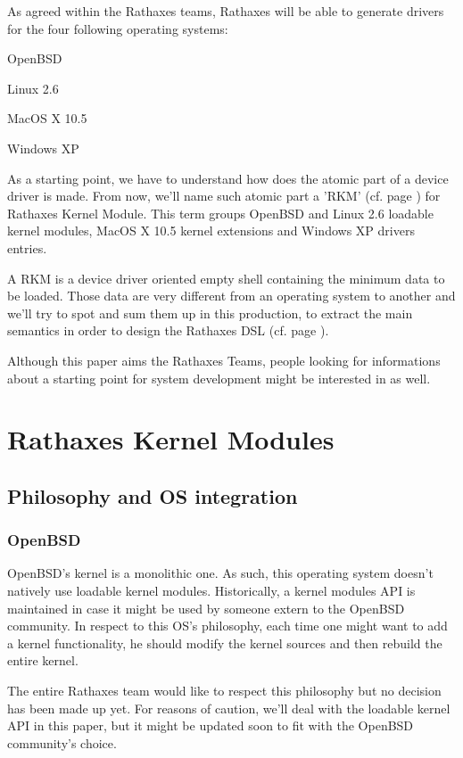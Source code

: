 \documentclass[11pt]{report}
\begin{document}
As agreed within the Rathaxes teams, Rathaxes will be able to generate drivers
for the four following operating systems:
\begin{description}
    \item{OpenBSD}
    \item{Linux 2.6}
    \item{MacOS X 10.5}
    \item{Windows XP}
\end{description}

As a starting point, we have to understand how does the atomic part of a device 
driver is made. From now, we'll name such atomic part a 'RKM' (cf. page \pageref{RKM}) 
for Rathaxes Kernel Module. This term groups OpenBSD and Linux 2.6 loadable kernel modules,
MacOS X 10.5 kernel extensions and Windows XP drivers entries.

A RKM is a device driver oriented empty shell containing the minimum data
to be loaded. Those data are very different from an operating system to
another and we'll try to spot and sum them up in this production, to extract the
main semantics in order to design the Rathaxes DSL (cf. page \pageref{DSL}).

Although this paper aims the Rathaxes Teams, people looking for informations
about a starting point for system development might be interested in as well.

\tableofcontents

\chapter{Rathaxes Kernel Modules}

\section{Philosophy and OS integration}

  \subsection{OpenBSD}
OpenBSD's kernel is a monolithic one. As such, this operating system doesn't
natively use loadable kernel modules. Historically, a kernel modules API is
maintained in case it might be used by someone extern to the OpenBSD community.
In respect to this OS's philosophy, each time one might want to add a kernel
functionality, he should modify the kernel sources and then rebuild the entire
kernel.

The entire Rathaxes team would like to respect this philosophy but no decision
has been made up yet. For reasons of caution, we'll deal with the loadable
kernel API in this paper, but it might be updated soon to fit with the OpenBSD
community's choice.
\end{document}
